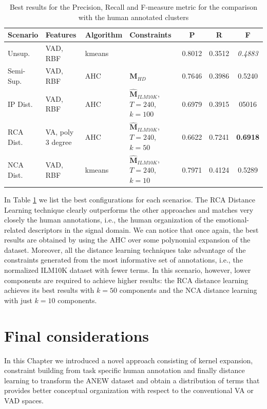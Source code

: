 \begin{table}[thb]
\begin{center}
  \bgroup
  \def\arraystretch{1.5}
\begin{tabular}{ ||l |l| l |p{} |c  |c|c||}
\hline
\hline
Scenario 		& Features 		&  Algorithm 	& Constraints 		& P 	& R 	& F \\
\hline
\hline
Unsup. 	& VAD, RBF & kmeans 		& 				 &  0.8012 & 0.3512 & {\color[HTML]{8E0000} \textit{0.4883}} \\
\hline
Semi-Sup. & VAD, RBF & AHC 		& $\mathbf{{M}}_{HD}$   	& 0.7646 & 0.3986 & 0.5240 \\
\hline
IP Dist. & VAD, RBF & AHC 		& $\mathbf{\hat{M}}_{ILM10K}$, $T=240$,$\quad \;$ $k=100$ & 0.6979 & 0.3915 & 05016 \\
\hline
RCA Dist. & VA, poly 3 degree & AHC & $\mathbf{\hat{M}}_{ILM10K}$, $T=240$,$\quad \;$ $k=50$ & 0.6622 & 0.7241 & {\color[HTML]{326B00}  \textbf{0.6918}} \\
\hline
NCA Dist.& VAD, RBF & kmeans & $\mathbf{\hat{M}}_{ILM10K}$, $T=240$,$\quad \;$ $k=10$ & 0.7971 & 0.4124 & 0.5289  \\
\hline
\hline
\end{tabular}\quad
\egroup
\end{center}
\caption{Best results for the Precision, Recall and F-measure metric for the comparison with the human annotated clusters }
\label{tab:ANEWf_measure}
\end{table}

In Table \ref{tab:ANEWf_measure} we list the best configurations for each scenarios. The RCA Distance Learning technique clearly outperforms the other approaches and matches very closely the human annotations, i.e., the human organization of the emotional-related descriptors in the signal domain. We can notice that once again, the best results are obtained by using the AHC over some polynomial expansion of the dataset. Moreover, all the distance learning techniques take advantage of the constraints generated from the most informative set of annotations, i.e., the normalized ILM10K dataset with fewer terms. In this scenario, however, lower components are required to achieve higher results: the RCA distance learning achieves its best results with $k=50$ components and the NCA distance learning with just $k=10$ components.

\section{Final considerations}\label{sec:ANEW:conclusions}
In this Chapter we introduced a novel approach consisting of kernel expansion, constraint building from task specific human annotation and finally distance learning to transform the ANEW dataset and obtain a distribution of terms that provides better conceptual organization with respect to the conventional VA or VAD spaces.

